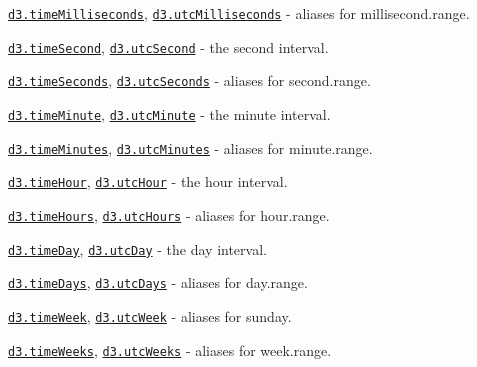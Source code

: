 \begin{DoxyItemize}
\item \href{https://github.com/d3/d3-time/blob/master/README.md#timeMillisecond}{\tt d3.\+time\+Milliseconds}, \href{https://github.com/d3/d3-time/blob/master/README.md#timeMillisecond}{\tt d3.\+utc\+Milliseconds} -\/ aliases for millisecond.\+range.
\item \href{https://github.com/d3/d3-time/blob/master/README.md#timeSecond}{\tt d3.\+time\+Second}, \href{https://github.com/d3/d3-time/blob/master/README.md#timeSecond}{\tt d3.\+utc\+Second} -\/ the second interval.
\item \href{https://github.com/d3/d3-time/blob/master/README.md#timeSecond}{\tt d3.\+time\+Seconds}, \href{https://github.com/d3/d3-time/blob/master/README.md#timeSecond}{\tt d3.\+utc\+Seconds} -\/ aliases for second.\+range.
\item \href{https://github.com/d3/d3-time/blob/master/README.md#timeMinute}{\tt d3.\+time\+Minute}, \href{https://github.com/d3/d3-time/blob/master/README.md#timeMinute}{\tt d3.\+utc\+Minute} -\/ the minute interval.
\item \href{https://github.com/d3/d3-time/blob/master/README.md#timeMinute}{\tt d3.\+time\+Minutes}, \href{https://github.com/d3/d3-time/blob/master/README.md#timeMinute}{\tt d3.\+utc\+Minutes} -\/ aliases for minute.\+range.
\item \href{https://github.com/d3/d3-time/blob/master/README.md#timeHour}{\tt d3.\+time\+Hour}, \href{https://github.com/d3/d3-time/blob/master/README.md#timeHour}{\tt d3.\+utc\+Hour} -\/ the hour interval.
\item \href{https://github.com/d3/d3-time/blob/master/README.md#timeHour}{\tt d3.\+time\+Hours}, \href{https://github.com/d3/d3-time/blob/master/README.md#timeHour}{\tt d3.\+utc\+Hours} -\/ aliases for hour.\+range.
\item \href{https://github.com/d3/d3-time/blob/master/README.md#timeDay}{\tt d3.\+time\+Day}, \href{https://github.com/d3/d3-time/blob/master/README.md#timeDay}{\tt d3.\+utc\+Day} -\/ the day interval.
\item \href{https://github.com/d3/d3-time/blob/master/README.md#timeDay}{\tt d3.\+time\+Days}, \href{https://github.com/d3/d3-time/blob/master/README.md#timeDay}{\tt d3.\+utc\+Days} -\/ aliases for day.\+range.
\item \href{https://github.com/d3/d3-time/blob/master/README.md#timeWeek}{\tt d3.\+time\+Week}, \href{https://github.com/d3/d3-time/blob/master/README.md#timeWeek}{\tt d3.\+utc\+Week} -\/ aliases for sunday.
\item \href{https://github.com/d3/d3-time/blob/master/README.md#timeWeek}{\tt d3.\+time\+Weeks}, \href{https://github.com/d3/d3-time/blob/master/README.md#timeWeek}{\tt d3.\+utc\+Weeks} -\/ aliases for week.\+range.

\end{DoxyItemize}
